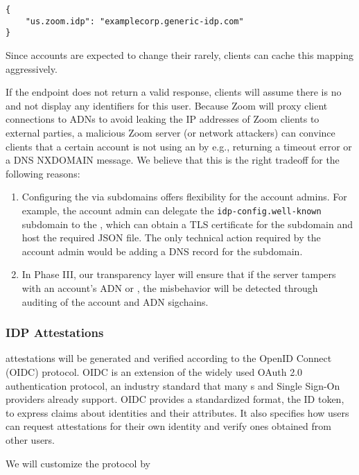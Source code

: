 \begingroup{}
\fontsize{10pt}{12pt}\selectfont{}
\begin{verbatim}
{
    "us.zoom.idp": "examplecorp.generic-idp.com"
}
\end{verbatim}
\endgroup{}

Since accounts are expected to change their \idp rarely, clients can cache this mapping
aggressively.

If the endpoint does not return a valid response, clients will assume there is no \idp and not
display any identifiers for this user. Because Zoom will proxy client connections to ADNs to avoid
leaking the IP addresses of Zoom clients to external parties, a malicious Zoom server (or network
attackers) can convince clients that a certain account is not using an \idp by e.g., returning a
timeout error or a DNS NXDOMAIN message. We believe that this is the right tradeoff for the
following reasons:

\begin{enumerate}
\item Configuring the \idp via subdomains offers flexibility for the account admins. For example,
    the account admin can delegate the \texttt{idp-config.well-known} subdomain to the \idp, which
    can obtain a TLS certificate for the subdomain and host the required JSON file. The only
    technical action required by the account admin would be adding a DNS record for the
    subdomain.
\item In Phase III, our transparency layer will ensure that if the server tampers with an account’s
    ADN or \idp, the misbehavior will be detected through auditing of the account and ADN sigchains.
\end{enumerate}

\subsubsection{IDP Attestations}

\idp attestations will be generated and verified according to the OpenID Connect (OIDC) protocol.
OIDC is an extension of the widely used OAuth 2.0 authentication protocol, an industry standard that
many {\idp}s and Single Sign-On providers already support. OIDC provides a standardized format, the
ID token, to express claims about identities and their attributes. It also specifies how users can
request attestations for their own identity and verify ones obtained from other users.

We will customize the protocol by

